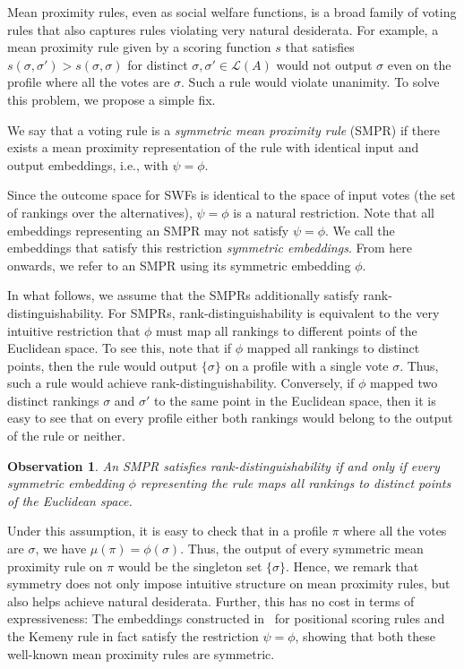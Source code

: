 \documentclass[prodmode,acmec]{ec-acmsmall}
\newcommand{\calL}{{\mathcal{L}}}
\newcommand{\rank}{{\calL(A)}}
\newtheorem{observation}[theorem]{Observation}
\begin{document}
Mean proximity rules, even as social welfare functions, is a broad family of voting rules that also captures rules violating very natural desiderata. For example, a mean proximity rule given by a scoring function $s$ that satisfies $s(\sigma,\sigma') > s(\sigma,\sigma)$ for distinct $\sigma,\sigma' \in \rank$ would not output $\sigma$ even on the profile where all the votes are $\sigma$. Such a rule would violate unanimity. To solve this problem, we propose a simple fix. 

\begin{definition}
We say that a voting rule is a \emph{symmetric mean proximity rule} (SMPR) if there exists a mean proximity representation of the rule with identical input and output embeddings, i.e., with $\psi = \phi$. 
\end{definition} 

Since the outcome space for SWFs is identical to the space of input votes (the set of rankings over the alternatives), $\psi = \phi$ is a natural restriction. Note that all embeddings representing an SMPR may not satisfy $\psi = \phi$. We call the embeddings that satisfy this restriction \emph{symmetric embeddings}. From here onwards, we refer to an SMPR using its symmetric embedding $\phi$. 

In what follows, we assume that the SMPRs additionally satisfy rank-distinguishability. For SMPRs, rank-distinguishability is equivalent to the very intuitive restriction that $\phi$ must map all rankings to different points of the Euclidean space. To see this, note that if $\phi$ mapped all rankings to distinct points, then the rule would output $\{\sigma\}$ on a profile with a single vote $\sigma$. Thus, such a rule would achieve rank-distinguishability. Conversely, if $\phi$ mapped two distinct rankings $\sigma$ and $\sigma'$ to the same point in the Euclidean space, then it is easy to see that on every profile either both rankings would belong to the output of the rule or neither. 


\begin{observation}
An SMPR satisfies rank-distinguishability if and only if every symmetric embedding $\phi$ representing the rule maps all rankings to distinct points of the Euclidean space. 
\end{observation}

Under this assumption, it is easy to check that in a profile $\pi$ where all the votes are $\sigma$, we have $\mu(\pi) = \phi(\sigma)$. Thus, the output of every symmetric mean proximity rule on $\pi$ would be the singleton set $\{\sigma\}$. Hence, we remark that symmetry does not only impose intuitive structure on mean proximity rules, but also helps achieve natural desiderata. Further, this has no cost in terms of expressiveness: The embeddings constructed in~\cite{Zwicker08a} for positional scoring rules and the Kemeny rule in fact satisfy the restriction $\psi = \phi$, showing that both these well-known mean proximity rules are symmetric. 
\end{document}

